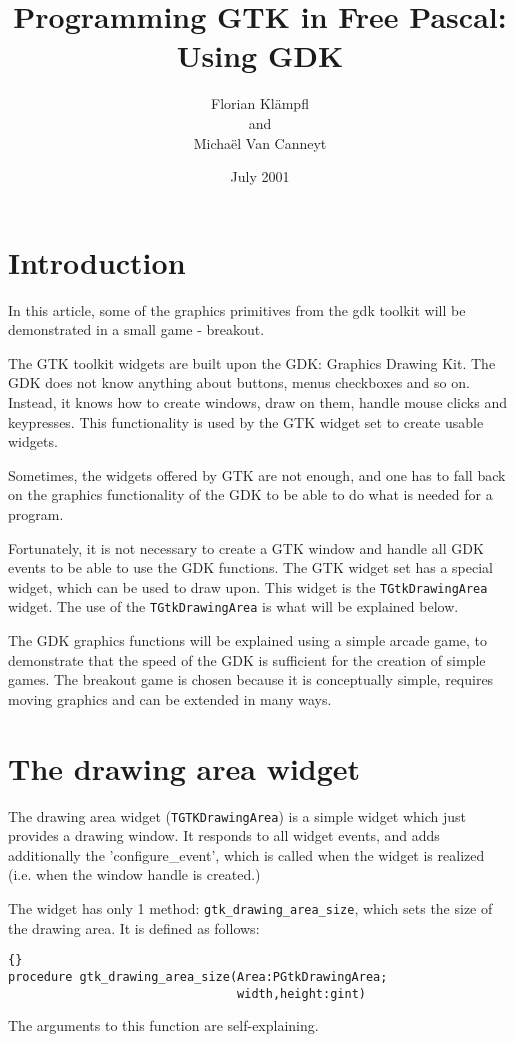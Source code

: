 \documentclass[10pt]{article}
\newcommand{\var}[1]{\texttt{#1}}
\begin{document}
\title{Programming GTK in Free Pascal: Using GDK}
\author{Florian Kl\"ampfl\\and\\Micha\"el Van Canneyt}
\date{July 2001}
\maketitle
\section{Introduction}
In this article, some of the graphics primitives from the gdk toolkit will
be demonstrated in a small game - breakout.

The GTK toolkit widgets are built upon the GDK: Graphics Drawing Kit. 
The GDK does not know anything about buttons, menus checkboxes and so on.
Instead, it knows how to create windows, draw on them, handle mouse clicks
and keypresses. This functionality is used by the GTK widget set to create
usable widgets.

Sometimes, the widgets offered by GTK are not enough, and one has to fall
back on the graphics functionality of the GDK to be able to do what is 
needed for a program.

Fortunately, it is not necessary to create a GTK window and handle all
GDK events to be able to use the GDK functions. The GTK widget set has a
special widget, which can be used to draw upon. This widget is the 
\var{TGtkDrawingArea} widget. The use of the \var{TGtkDrawingArea} is what
will be explained below.

The GDK graphics functions will be explained using a simple arcade game,
to demonstrate that the speed of the GDK is sufficient for the creation of
simple games. The breakout game is chosen because it is conceptually simple, 
requires moving graphics and can be extended in many ways.

\section{The drawing area widget}
The drawing area widget (\var{TGTKDrawingArea}) is a simple widget which
just provides a drawing window. It responds to all widget events, and adds
additionally the 'configure\_event', which is called when the widget is
realized (i.e. when the window handle is created.)

The widget has only 1 method: \var{gtk\_drawing\_area\_size}, which sets
the size of the drawing area. It is defined as follows:
\begin{lstlisting}{}
procedure gtk_drawing_area_size(Area:PGtkDrawingArea;
                                width,height:gint)
\end{lstlisting}{}
The arguments to this function are self-explaining.
\end{document}
